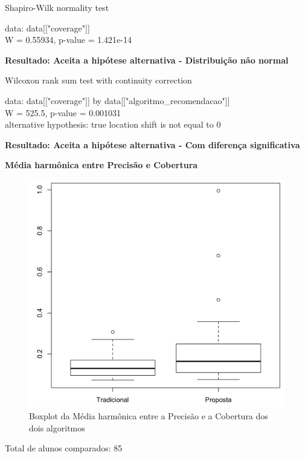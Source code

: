     Shapiro-Wilk normality test

\noindent
data:  data[["coverage"]]\\
W = 0.55934, p-value = 1.421e-14

\textbf{Resultado: Aceita a hipótese alternativa - Distribuição não normal}

  Wilcoxon rank sum test with continuity correction

\noindent
data:  data[["coverage"]] by data[["algoritmo\_recomendacao"]]\\
W = 525.5, p-value = 0.001031\\
alternative hypothesis: true location shift is not equal to 0

\textbf{Resultado: Aceita a hipótese alternativa - Com diferença significativa}

\textbf{Média harmônica entre Precisão e Cobertura}

\begin{figure}[htb]
  \caption{\label{fig:media-harmonica-boxplot}Boxplot da Média harmônica entre a Precisão e a Cobertura dos dois algoritmos}
  \begin{center}
      \includegraphics[scale=0.4]{./Figuras/media-harmonica-boxplot.png}
  \end{center}
\end{figure}

Total de alunos comparados: 85

